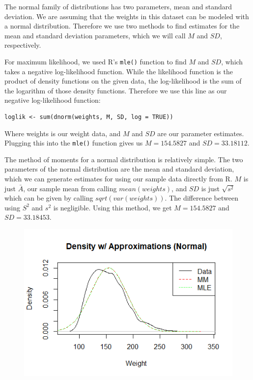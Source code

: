 \documentclass[12pt, a4paper, oneside]{report}
\begin{document}
\newpage
The normal family of distributions has two parameters, mean and standard deviation. We are assuming that the weights in this dataset can be modeled with a normal distribution. Therefore we use two methods to find estimates for the mean and standard deviation parameters, which we will call \(M\) and \(SD\), respectively.

For maximum likelihood, we used R's \lstinline{mle()} function to find \(M\) and \(SD\), which takes a negative log-likelihood function. While the likelihood function is the product of density functions on the given data, the log-likelihood is the sum of the logarithm of those density functions. Therefore we use this line as our negative log-likelihood function:

\begin{lstlisting}
loglik <- sum(dnorm(weights, M, SD, log = TRUE))
\end{lstlisting}

Where weights is our weight data, and \(M\) and \(SD\) are our parameter estimates. Plugging this into the \lstinline{mle()} function gives us \(M = 154.5827\) and \(SD = 33.18112\).

The method of moments for a normal distribution is relatively simple. The two parameters of the normal distribution are the mean and standard deviation, which we can generate estimates for using our sample data directly from R. \(M\) is just \(\bar{A}\), our sample mean from calling \(mean(weights)\), and \(SD\) is just \(\sqrt{s^2}\) which can be given by calling \(sqrt(var(weights))\). The difference between using \(S^2\) and \(s^2\) is negligible. Using this method, we get \(M = 154.5827\) and \(SD = 33.18453\).

\begin{figure}[h]
  \centering
  \includegraphics[width=\linewidth]{normDensityA.png}
\end{figure}
\end{document}

